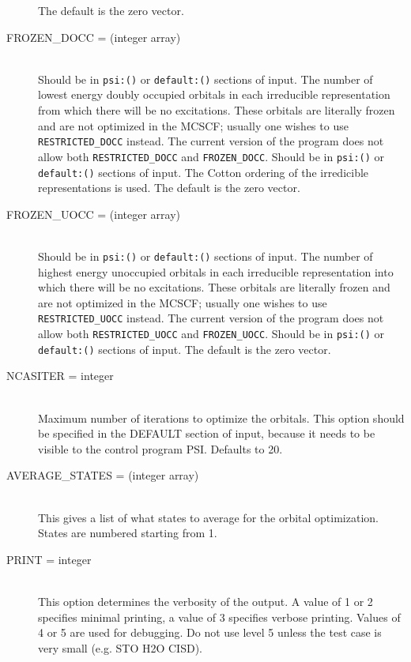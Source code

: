 \begin{description}
The default is the zero vector.
\item[FROZEN\_DOCC = (integer array)]\mbox{}\\
Should be in {\tt psi:()} or {\tt default:()} sections of input.
The number of lowest energy doubly occupied orbitals in each irreducible
representation from which there will be no excitations.  
These orbitals are literally frozen and are not optimized in the MCSCF;
usually one wishes to use {\tt RESTRICTED\_DOCC} instead.
The current version of the program does not allow both
{\tt RESTRICTED\_DOCC} and {\tt FROZEN\_DOCC}.
Should be in {\tt psi:()} or {\tt default:()} sections of input.
The Cotton ordering of the irredicible representations is used.
The default is the zero vector.
\item[FROZEN\_UOCC = (integer array)]\mbox{}\\
Should be in {\tt psi:()} or {\tt default:()} sections of input.
The number of highest energy unoccupied orbitals in each irreducible
representation into which there will be no excitations.
These orbitals are literally frozen and are not optimized in the MCSCF;
usually one wishes to use {\tt RESTRICTED\_UOCC} instead.
The current version of the program does not allow both
{\tt RESTRICTED\_UOCC} and {\tt FROZEN\_UOCC}.
Should be in {\tt psi:()} or {\tt default:()} sections of input.
The default is the zero vector.
\item[NCASITER = integer]\mbox{}\\
Maximum number of iterations to optimize the orbitals.  This option
should be specified in the DEFAULT section of input, because
it needs to be visible to the control program PSI.  Defaults to 20.
\item[AVERAGE\_STATES = (integer array)]\mbox{}\\
This gives a list of what states to average for the orbital 
optimization.  States are numbered starting from 1.
\item[PRINT = integer]\mbox{}\\
This option determines the verbosity of the output.  A value of 1 or
2 specifies minimal printing, a value of 3 specifies verbose printing.
Values of 4 or 5 are used for debugging.  Do not use level 5 unless
the test case is very small (e.g. STO H2O CISD).
\end{description}

